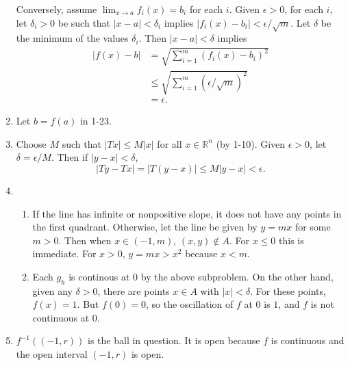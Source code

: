 \documentclass{article}
\begin{document}
\begin{enumerate}[label=\textbf{1-\arabic*.}]
Conversely, assume $\lim_{x\to a}f_i(x)= b_i$ for each $i$. Given $\epsilon > 0$, for each $i$, let $\delta_i > 0$ be such that $|x - a| < \delta_i$ implies $|f_i(x) - b_i| < \epsilon / \sqrt{m}$. Let $\delta$ be the minimum of the values $\delta_i$. Then $|x - a| < \delta$ implies 
\begin{align*}
|f(x) - b| &= \sqrt{\sum_{i=1}^m (f_i(x) - b_i)^2}\\
	&\leq \sqrt{\sum_{i=1}^m (\epsilon/\sqrt{m})^2}\\
	&= \epsilon.
\end{align*}
\item Let $b=f(a)$ in 1-23.
\item Choose $M$ such that $|Tx|\leq M|x|$ for all $x\in \mathbb R^n$ (by 1-10). Given $\epsilon > 0$, let $\delta = \epsilon/M$. Then if $|y-x| < \delta$, \[|Ty-Tx| = |T(y-x)| \leq M|y-x| < \epsilon.\]
\item
\begin{enumerate}
\item If the line has infinite or nonpositive slope, it does not have any points in the first quadrant. Otherwise, let the line be given by $y=mx$ for some $m>0$. Then when $x \in (-1,m)$, $(x,y)\notin A$. For $x \leq 0$ this is immediate. For $x > 0$, $y = mx > x^2$ because $x<m$.
\item Each $g_h$ is continous at $0$ by the above subproblem. On the other hand, given any $\delta > 0$, there are points $x\in A$ with $|x|<\delta$. For these points, $f(x) = 1$. But $f(0) = 0$, so the oscillation of $f$ at $0$ is $1$, and $f$ is not continuous at $0$.
\end{enumerate}
\item $f^{-1}((-1,r))$ is the ball in question. It is open because $f$ is continuous and the open interval $(-1,r)$ is open.
\end{enumerate}
\end{document}
